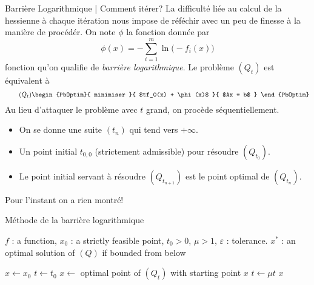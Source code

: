 \documentclass[aspectratio = 169]{beamer}
\begin{document}
\begin{frame}{Barrière Logarithmique | Comment itérer?}
  La difficulté liée au calcul de la hessienne à chaque itération nous
  impose de réféchir avec un peu de finesse à la manière de
  procédér. On note $\phi$ la fonction donnée par
  \[
    \phi(x) = - \sum_{i=1}^m \ln\big(-f_i(x)\big)
  \]
  fonction qu'on qualifie de \emph{barrière logarithmique}. \pause Le
  problème $(Q_t)$ est équivalent à
  \begin{equation}
    \label{Qtrf}
    \tag{$Q_t$}
    \begin{PbOptim}{
        minimiser
      }{
        $tf_0(x) + \phi(x)$
      }{
        $Ax = b$
      }
    \end{PbOptim}
  \end{equation}
  \pause Au lieu d'attaquer le problème avec $t$ grand, on procède
  séquentiellement.
  \begin{itemize}
  \item<1-> On se donne une suite $(t_n)$ qui tend vers $+\infty$.
  \item<2-> Un point initial $t_{0, 0}$ (strictement admissible) pour
    résoudre $(Q_{t_0})$.
  \item<3-> Le point initial servant à résoudre $(Q_{t_{n+1}})$ est le
    point optimal de $(Q_{t_{n}})$.
  \end{itemize}
\end{frame}

\begin{frame}
  \centering
  \begin{center}
    {\Huge Pour l'instant on a rien montré!}
  \end{center}
\end{frame}

\begin{frame}{Méthode de la barrière logarithmique}
    \begin{algorithm}[H]
    \caption{Méthode de la barrière logarithmique}
    \small{
      \begin{algorithmic}[1]
        \Statex
        \Require $f$ : a function, $x_0$ : a strictly feasible point,
        $t_0 > 0$, $\mu > 1$, $\varepsilon$ : tolerance.
        \Ensure $x^*$ : an optimal solution of $(Q)$ if bounded from below

        \State $x \leftarrow x_0$
        \State $t \leftarrow t_0$
        \State $x \leftarrow$ optimal point of $(Q_t)$ with starting point $x$
        \State $t \leftarrow \mu t$
        \EndWhile
        \State \Return $x$
        \EndFunction
        \Statex
      \end{algorithmic}
    }
  \end{algorithm}
\end{frame}
\end{document}
